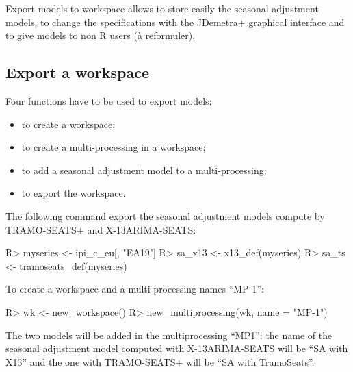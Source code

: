 \documentclass[article]{jss}
\providecommand{\tightlist}{%
  \setlength{\itemsep}{0pt}\setlength{\parskip}{0pt}}
\begin{document}
Export models to workspace allows to store easily the seasonal
adjustment models, to change the specifications with the JDemetra+
graphical interface and to give models to non R users (à reformuler).

\hypertarget{export-wk}{%
\subsection{Export a workspace}\label{export-wk}}

Four functions have to be used to export models:

\begin{itemize}
\tightlist
\item
   to create a workspace;\\
\item
   to create a multi-processing in a
  workspace;\\
\item
   to add a seasonal adjustment model to a
  multi-processing;\\
\item
   to export the workspace.
\end{itemize}

The following command export the seasonal adjustment models compute by
TRAMO-SEATS+ and X-13ARIMA-SEATS:

\begin{CodeChunk}

\begin{CodeInput}
R> myseries <- ipi_c_eu[, "EA19"]
R> sa_x13 <- x13_def(myseries)
R> sa_ts <- tramoseats_def(myseries)
\end{CodeInput}
\end{CodeChunk}

To create a workspace and a multi-processing names ``MP-1'':

\begin{CodeChunk}

\begin{CodeInput}
R> wk <- new_workspace()
R> new_multiprocessing(wk, name = "MP-1")
\end{CodeInput}
\end{CodeChunk}

The two models will be added in the multiprocessing ``MP1'': the name of
the seasonal adjustment model computed with X-13ARIMA-SEATS will be ``SA
with X13'' and the one with TRAMO-SEATS+ will be ``SA with TramoSeats''.
\end{document}
